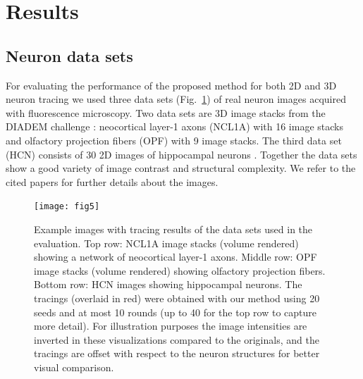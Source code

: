 \section{Results}
\label{sec:results}
\subsection{Neuron data sets} 
\label{subsec:neuron-datasets}
For evaluating the performance of the proposed method for both 2D and 3D neuron tracing we used three data sets (Fig.~\ref{fig5}) of real neuron images acquired with fluorescence microscopy. Two data sets are 3D image stacks from the DIADEM challenge \cite{brown2011diadem}: neocortical layer-1 axons (NCL1A) with 16 image stacks and olfactory projection fibers (OPF) with 9 image stacks. The third data set (HCN) consists of 30 2D images of hippocampal neurons \cite{steiner2002overexpression}. Together the data sets show a good variety of image contrast and structural complexity. We refer to the cited papers for further details about the images.
\begin{figure}
	\centering
	\texttt{[image: fig5]}
	\caption{Example images with tracing results of the data sets used in the evaluation. Top row: NCL1A image stacks (volume rendered) showing a network of neocortical layer-1 axons. Middle row: OPF image stacks (volume rendered) showing olfactory projection fibers. Bottom row: HCN images showing hippocampal neurons. The tracings (overlaid in red) were obtained with our method using 20 seeds and at most 10 rounds (up to 40 for the top row to capture more detail). For illustration purposes the image intensities are inverted in these visualizations compared to the originals, and the tracings are offset with respect to the neuron structures for better visual comparison.}
	\label{fig5}
\end{figure}

